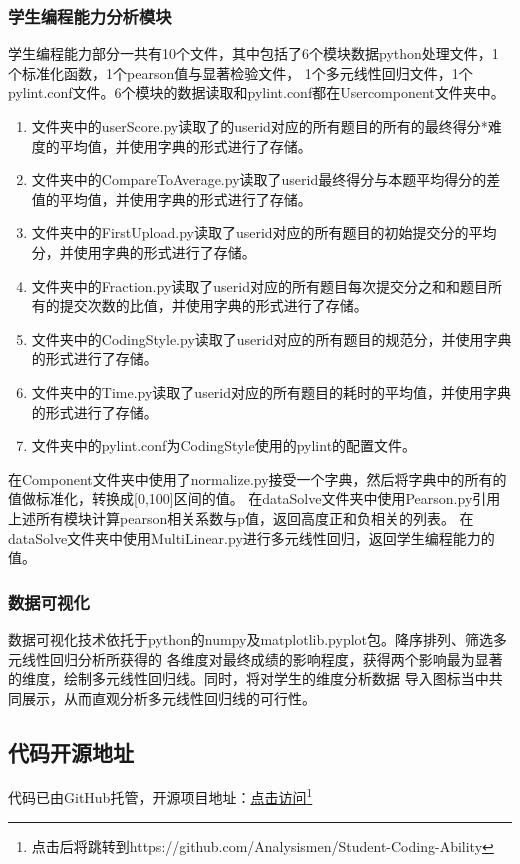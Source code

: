 \documentclass[UTF8]{ctexart}
\begin{document}
\subsubsection{学生编程能力分析模块}

学生编程能力部分一共有10个文件，其中包括了6个模块数据python处理文件，1个标准化函数，1个pearson值与显著检验文件，
1个多元线性回归文件，1个pylint.conf文件。6个模块的数据读取和pylint.conf都在Usercomponent文件夹中。

\begin{enumerate}

    \item 文件夹中的userScore.py读取了的userid对应的所有题目的所有的最终得分*难度的平均值，并使用字典的形式进行了存储。
    \item 文件夹中的CompareToAverage.py读取了userid最终得分与本题平均得分的差值的平均值，并使用字典的形式进行了存储。
    \item 文件夹中的FirstUpload.py读取了userid对应的所有题目的初始提交分的平均分，并使用字典的形式进行了存储。
    \item 文件夹中的Fraction.py读取了userid对应的所有题目每次提交分之和和题目所有的提交次数的比值，并使用字典的形式进行了存储。
    \item 文件夹中的CodingStyle.py读取了userid对应的所有题目的规范分，并使用字典的形式进行了存储。
    \item 文件夹中的Time.py读取了userid对应的所有题目的耗时的平均值，并使用字典的形式进行了存储。
    \item 文件夹中的pylint.conf为CodingStyle使用的pylint的配置文件。

\end{enumerate}

在Component文件夹中使用了normalize.py接受一个字典，然后将字典中的所有的值做标准化，转换成[0,100]区间的值。
在dataSolve文件夹中使用Pearson.py引用上述所有模块计算pearson相关系数与p值，返回高度正和负相关的列表。
在dataSolve文件夹中使用MultiLinear.py进行多元线性回归，返回学生编程能力的值。
\subsubsection{数据可视化}
数据可视化技术依托于python的numpy及matplotlib.pyplot包。降序排列、筛选多元线性回归分析所获得的
各维度对最终成绩的影响程度，获得两个影响最为显著的维度，绘制多元线性回归线。同时，将对学生的维度分析数据
导入图标当中共同展示，从而直观分析多元线性回归线的可行性。
\subsection{代码开源地址}
代码已由GitHub托管，开源项目地址：\href{https://github.com/Analysismen/Student-Coding-Ability}{点击访问}\footnote{点击后将跳转到https://github.com/Analysismen/Student-Coding-Ability}
\end{document}
